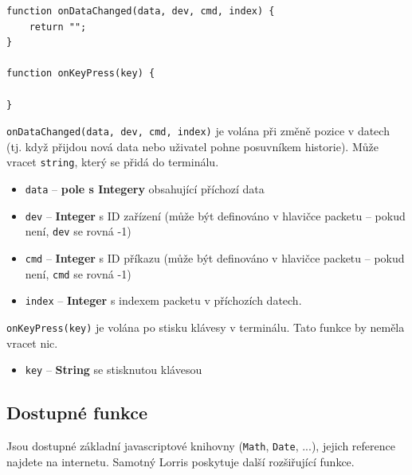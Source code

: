 \documentclass[12pt, a4paper, oneside]{article}
\begin{document}
\begin{lstlisting}[caption=Základní script]
function onDataChanged(data, dev, cmd, index) {
    return "";
}

function onKeyPress(key) {

}
\end{lstlisting}

{\color{blue}\verb/onDataChanged(data, dev, cmd, index)/} je volána při změně pozice v datech (tj. když přijdou nová data nebo uživatel pohne posuvníkem historie). Může vracet \verb/string/, který se přidá do terminálu.

\begin{itemize}
    \item \verb/data/ -- {\bf pole s Integery} obsahující příchozí data
    \item \verb/dev/ -- {\bf Integer} s ID zařízení (může být definováno v hlavičce packetu -- pokud není, \verb/dev/ se rovná -1)
    \item \verb/cmd/ -- {\bf Integer} s ID příkazu (může být definováno v hlavičce packetu -- pokud není, \verb/cmd/ se rovná -1)
    \item \verb/index/ -- {\bf Integer} s indexem packetu v příchozích datech.
\end{itemize}

{\color{blue}\verb/onKeyPress(key)/} je volána po stisku klávesy v terminálu. Tato funkce by neměla vracet nic.
\begin{itemize}
    \item \verb/key/ -- {\bf String} se stisknutou klávesou
\end{itemize}

\subsection*{Dostupné funkce}
Jsou dostupné základní javascriptové knihovny (\verb/Math/, \verb/Date/, ...), jejich reference najdete na internetu. Samotný Lorris poskytuje další rozšiřující funkce. 
\end{document}
